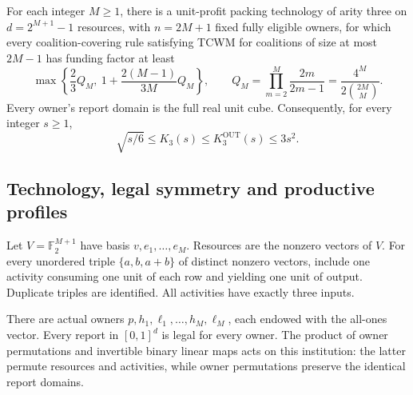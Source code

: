 \begin{theorem}\label{thm:projective}
For each integer $M\ge1$, there is a unit-profit packing technology of arity
three on $d=2^{M+1}-1$ resources, with $n=2M+1$ fixed fully eligible owners,
for which every coalition-covering rule satisfying TCWM for coalitions of
size at most $2M-1$ has funding factor at least
\begin{equation}\label{eq:projective-finite}
 \max\left\{\frac23 Q_M,\ 1+\frac{2(M-1)}{3M}Q_M\right\},
 \qquad Q_M=\prod_{m=2}^M\frac{2m}{2m-1}
             =\frac{4^M}{2\binom{2M}{M}}.
\end{equation}
Every owner's report domain is the full real unit cube. Consequently, for
every integer $s\ge1$,
\begin{equation}\label{eq:main-interval}
 \sqrt{s/6}\le K_3(s)\le K_3^{\mathrm{OUT}}(s)\le3s^2.
\end{equation}
\end{theorem}

\subsection{Technology, legal symmetry and productive profiles}
Let $V=\mathbb F_2^{M+1}$ have basis $v,e_1,\ldots,e_M$.
Resources are the nonzero vectors of $V$. For every unordered triple
$\{a,b,a+b\}$ of distinct nonzero vectors, include one activity consuming one
unit of each row and yielding one unit of output. Duplicate triples are
identified. All activities have exactly three inputs.

There are actual owners $p,h_1,\ell_1,\ldots,h_M,\ell_M$, each endowed with
the all-ones vector. Every report in $[0,1]^d$ is legal for every owner.
The product of owner permutations and invertible binary linear maps acts on
this institution: the latter permute resources and activities, while owner
permutations preserve the identical report domains.

